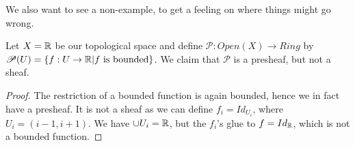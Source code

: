 We also want to see a non-example, to get a feeling on where things might go wrong. 
\begin{example}
Let $X=\mathbb{R}$ be our topological space and define $\mathscr{P}:Open(X)\longrightarrow Ring$ by $\mathscr{P}(U)=\{ f:U\rightarrow \mathbb{R} \vert f \text{ is bounded} \}$. We claim that $\mathscr{P}$ is a presheaf, but not a sheaf. 

\begin{proof}
The restriction of a bounded function is again bounded, hence we in fact have a presheaf. It is not a sheaf as we can define $f_i=Id_{U_i}$, where $U_i = (i-1, i+1)$. We have $\cup U_i = \mathbb{R}$, but the $f_i$'s glue to $f=Id_{\mathbb{R}}$, which is not a bounded function. 
\end{proof}
\end{example}


